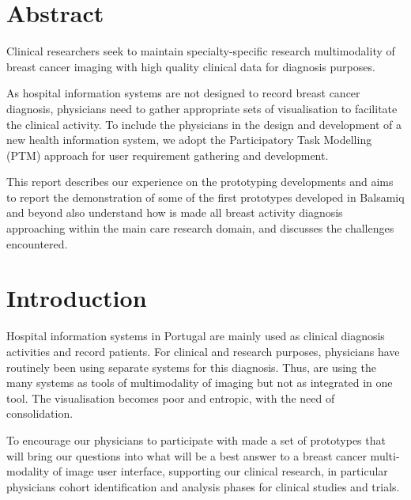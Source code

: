\begin{titlepage}

\vfill %

\end{titlepage}

\section{Abstract}

Clinical researchers seek to maintain specialty-specific research multimodality of breast cancer imaging with high quality clinical data for diagnosis purposes.

As hospital information systems are not designed to record breast cancer diagnosis, physicians need to gather appropriate sets of visualisation to facilitate the clinical activity. To include the physicians in the design and development of a new health information system, we adopt the Participatory Task Modelling (PTM) \cite{o2004participatory, keungparticipatory} approach for user requirement gathering and development.

This report describes our experience on the prototyping developments and aims to report the demonstration of some of the first prototypes developed in Balsamiq \cite{Balsamiq} and beyond also understand how is made all breast activity diagnosis approaching within the main care research domain, and discusses the challenges encountered.

\clearpage

\section{Introduction}

Hospital information systems in Portugal are mainly used as clinical diagnosis activities and record patients. For clinical and research purposes, physicians have routinely been using separate systems for this diagnosis. Thus, are using the many systems as tools of multimodality of imaging but not as integrated in one tool. The visualisation becomes poor and entropic, with the need of consolidation.

To encourage our physicians to participate with made a set of prototypes that will bring our questions into what will be a best answer to a breast cancer multi-modality of image user interface, supporting our clinical research, in particular physicians cohort identification and analysis phases for clinical studies and trials.

